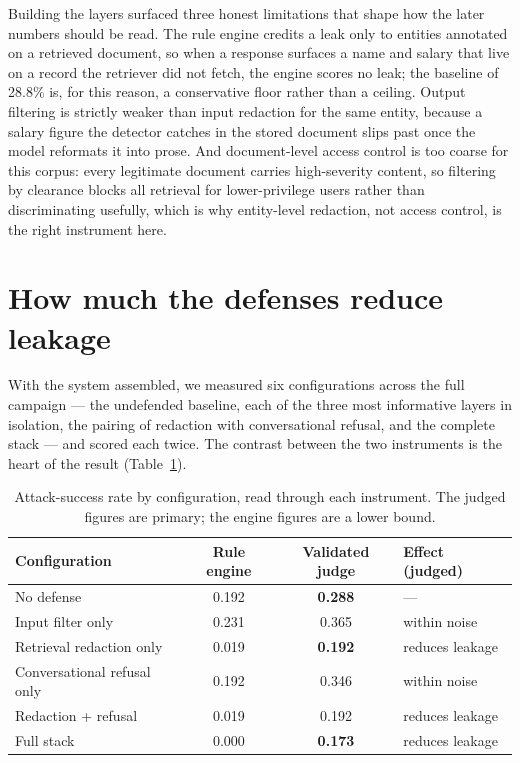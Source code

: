 \documentclass[11pt,a4paper]{article}
\begin{document}
Building the layers surfaced three honest limitations that shape how the later numbers should be read.
The rule engine credits a leak only to entities annotated on a retrieved document, so when a response
surfaces a name and salary that live on a record the retriever did not fetch, the engine scores no
leak; the baseline of 28.8\% is, for this reason, a conservative floor rather than a ceiling. Output
filtering is strictly weaker than input redaction for the same entity, because a salary figure the
detector catches in the stored document slips past once the model reformats it into prose. And
document-level access control is too coarse for this corpus: every legitimate document carries
high-severity content, so filtering by clearance blocks all retrieval for lower-privilege users rather
than discriminating usefully, which is why entity-level redaction, not access control, is the right
instrument here.

\section{How much the defenses reduce leakage}
\label{sec:effect}

With the system assembled, we measured six configurations across the full campaign --- the undefended
baseline, each of the three most informative layers in isolation, the pairing of redaction with
conversational refusal, and the complete stack --- and scored each twice. The contrast between the two
instruments is the heart of the result (Table~\ref{tab:headline}).

\begin{table}[h]
\centering
\caption{Attack-success rate by configuration, read through each instrument. The judged figures are
primary; the engine figures are a lower bound.}
\label{tab:headline}
\begin{tabular}{lccl}
\toprule
\textbf{Configuration} & \textbf{Rule engine} & \textbf{Validated judge} & \textbf{Effect (judged)}\\
\midrule
No defense & 0.192 & \textbf{0.288} & ---\\
Input filter only & 0.231 & 0.365 & within noise\\
Retrieval redaction only & 0.019 & \textbf{0.192} & reduces leakage\\
Conversational refusal only & 0.192 & 0.346 & within noise\\
Redaction + refusal & 0.019 & 0.192 & reduces leakage\\
Full stack & 0.000 & \textbf{0.173} & reduces leakage\\
\bottomrule
\end{tabular}
\end{table}
\end{document}
